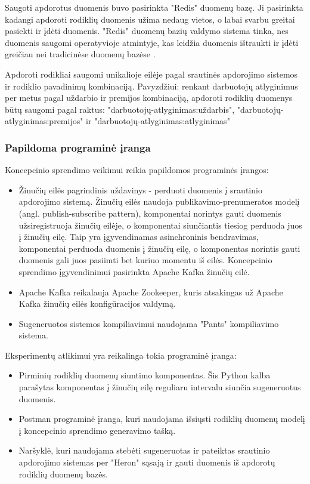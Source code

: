 \documentclass{VUMIFPSbakalaurinis}
\begin{document}
Saugoti apdorotus duomenis buvo pasirinkta "Redis" duomenų bazę. Ji pasirinkta kadangi apdoroti rodiklių duomenis užima nedaug vietos, o labai svarbu greitai pasiekti ir įdėti duomenis. "Redis" duomenų bazių valdymo sistema tinka, nes duomenis saugomi operatyvioje atmintyje, kas leidžia duomenis ištraukti ir įdėti greičiau nei tradicinėse duomenų bazėse \cite{carlson2013redis}.\par
Apdoroti rodikliai saugomi unikalioje eilėje pagal srautinės apdorojimo sistemos ir rodiklio pavadinimų kombinaciją. Pavyzdžiui: renkant darbuotojų atlyginimus per metus pagal uždarbio ir premijos kombinaciją, apdoroti rodiklių duomenys būtų saugomi pagal raktus: "darbuotojų-atlyginimas:uždarbis", "darbuotojų-atlyginimas:premijos" ir "darbuotojų-atlyginimas:atlyginimas"

\subsubsection{Papildoma programinė įranga}

Koncepcinio sprendimo veikimui reikia papildomos programinės įrangos:
\begin{itemize}
    \item Žinučių eilės pagrindinis uždavinys - perduoti duomenis į srautinio apdorojimo sistemą. Žinučių eilės naudoja publikavimo-prenumeratos modelį (angl. publish-subscribe pattern), komponentai norintys gauti duomenis užsiregistruoja žinučių eilėje, o komponentai siunčiantis tiesiog perduoda juos į žinučių eilę. Taip yra įgyvendinamas asinchroninis bendravimas, komponentai perduoda duomenis į žinučių eilę, o komponentas norintis gauti duomenis gali juos pasiimti bet kuriuo momentu iš eilės. Koncepcinio sprendimo įgyvendinimui pasirinkta Apache Kafka žinučių eilė.
    \item Apache Kafka reikalauja Apache Zookeeper, kuris atsakingas už Apache Kafka žinučių eilės konfigūracijos valdymą.
    \item Sugeneruotos sistemos kompiliavimui naudojama "Pants" kompiliavimo sistema.
\end{itemize}
Eksperimentų atlikimui yra reikalinga tokia programinė įranga:
\begin{itemize}
    \item Pirminių rodiklių duomenų siuntimo komponentas. Šis Python kalba parašytas komponentas į žinučių eilę reguliaru intervalu siunčia sugeneruotus duomenis.
    \item Postman programinė įranga, kuri naudojama išsiųsti rodiklių duomenų modelį į koncepcinio sprendimo generavimo tašką.
    \item Naršyklė, kuri naudojama stebėti sugeneruotas ir pateiktas srautinio apdorojimo sistemas per "Heron" sąsają ir gauti duomenis iš apdorotų rodiklių duomenų bazės.
\end{itemize}
\end{document}
